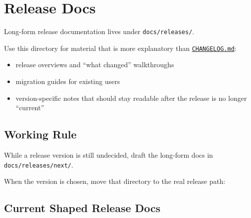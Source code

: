\chapter{Release Docs}\label{record-263}

\smallskip

Long-form release documentation lives under \texttt{d\allowbreak{}o\allowbreak{}c\allowbreak{}s\allowbreak{}/\allowbreak{}r\allowbreak{}e\allowbreak{}l\allowbreak{}e\allowbreak{}a\allowbreak{}s\allowbreak{}e\allowbreak{}s\allowbreak{}/}.

Use this directory for material that is more explanatory than \href{https://github.com/flyingrobots/bijou/blob/cbd70612140e7a450d764b3c7be1c6af878b99bc/docs/CHANGELOG.md}{\texttt{C\allowbreak{}H\allowbreak{}A\allowbreak{}N\allowbreak{}G\allowbreak{}E\allowbreak{}L\allowbreak{}O\allowbreak{}G\allowbreak{}.\allowbreak{}m\allowbreak{}d}}:

\begin{itemize}
\tightlist
\item
  release overviews and ``what changed'' walkthroughs
\item
  migration guides for existing users
\item
  version-specific notes that should stay readable after the release is no longer ``current''
\end{itemize}

\section{Working Rule}\label{record-263-working-rule}

While a release version is still undecided, draft the long-form docs in \texttt{d\allowbreak{}o\allowbreak{}c\allowbreak{}s\allowbreak{}/\allowbreak{}r\allowbreak{}e\allowbreak{}l\allowbreak{}e\allowbreak{}a\allowbreak{}s\allowbreak{}e\allowbreak{}s\allowbreak{}/\allowbreak{}n\allowbreak{}e\allowbreak{}x\allowbreak{}t\allowbreak{}/}.

When the version is chosen, move that directory to the real release path:



\section{Current Shaped Release Docs}\label{record-263-current-shaped-release-docs}

